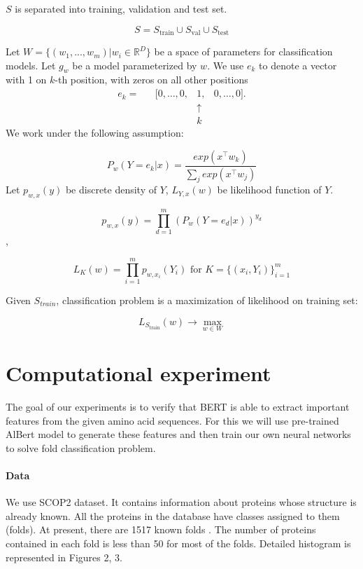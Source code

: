 \documentclass[12pt, twoside]{article}
\begin{document}
\noindent $S$ is separated into training, validation and test set. 

$$S = S_{\text{train}} \cup S_{\text{val}}  \cup S_{\text{test}}$$

Let $W = \{(w_1, ..., w_m)| w_i \in \mathbb{R}^D\}$ be a space of parameters for classification models. Let $g_w$ be a model parameterized by $w$.
We use $e_k$ to denote a vector with 1 on $k$-th position, with zeros on all other positions
\[
\begin{matrix}
e_{k} = &
        &[0,\ldots,0,&1,&0,\dots,0].\\
        &&&\uparrow&      \\
        &&&k&           
\end{matrix}
\]
We work under the following assumption:  

$$P_w(Y = e_k| x) = \frac{exp(x^{\top} w_k)}{\sum_j exp(x^{\top} w_j)}$$
Let $p_{w, x}(y)$ be discrete density of $Y$, $L_{Y, x}(w)$ be likelihood function of $Y$.  

$$p_{w, x}(y) = \prod_{d = 1}^{m} (P_w(Y = e_d| x))^{y_d}$$, 

$$L_{K}(w) = \prod_{i = 1}^{m} p_{w, x_i}(Y_i) \text{    for  } K = \{ (x_i, Y_i)\}_{i = 1}^m$$

Given $S_{train}$, classification problem is a maximization of likelihood on training set: 

$$ L_{S_{\text{train}}}(w) \rightarrow \max\limits_{w \in W}$$



\section{Computational experiment}

The goal of our experiments is to verify that BERT is able to extract important features from the given amino acid sequences. For this we will use pre-trained AlBert\cite{ProtBert} model to generate these features and then train our own neural networks to solve fold classification problem. 

\paragraph{Data}
\noindent
We use SCOP2 \cite{SCOP2FST, SCOP2SND} dataset. It contains information about proteins whose structure is already known. All the proteins in the database have classes assigned to them (folds).  At present, there are 1517 known folds \cite{SCOP2SND}. The number of proteins contained in each fold is less than 50 for most of the folds. Detailed histogram is represented in Figures 2, 3. 
\end{document}

